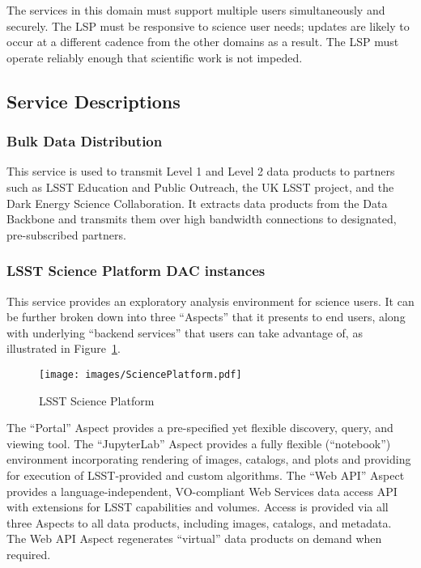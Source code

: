 \documentclass[DM,toc]{lsstdoc}
\begin{document}
The services in this domain must support multiple users simultaneously
and securely. The LSP must be responsive to science user needs; updates
are likely to occur at a different cadence from the other domains as a
result. The LSP must operate reliably enough that scientific work is not
impeded.

\subsection{Service Descriptions}\label{dac-service-descriptions}

\subsubsection{Bulk Data Distribution}\label{bulk-data-distribution}

This service is used to transmit Level 1 and Level 2 data products to
partners such as LSST Education and Public Outreach, the UK LSST
project, and the Dark Energy Science Collaboration. It extracts data
products from the Data Backbone and transmits them over high bandwidth
connections to designated, pre-subscribed partners.

\subsubsection{LSST Science Platform DAC
instances}\label{lsst-science-platform-dac-instances}

This service provides an exploratory analysis environment for science
users. It can be further broken down into three ``Aspects'' that it
presents to end users, along with underlying ``backend services'' that
users can take advantage of, as illustrated in Figure~\ref{fig:lsp}.

\begin{figure}
\centering
\texttt{[image: images/SciencePlatform.pdf]}
\caption{LSST Science Platform}
\label{fig:lsp}
\end{figure}

The ``Portal'' Aspect provides a pre-specified yet flexible discovery,
query, and viewing tool. The ``JupyterLab'' Aspect provides a fully
flexible (``notebook'') environment incorporating rendering of images,
catalogs, and plots and providing for execution of LSST-provided and
custom algorithms. The ``Web API'' Aspect provides a
language-independent, VO-compliant Web Services data access API with
extensions for LSST capabilities and volumes. Access is provided via all
three Aspects to all data products, including images, catalogs, and
metadata. The Web API Aspect regenerates ``virtual'' data products on
demand when required.
\end{document}
